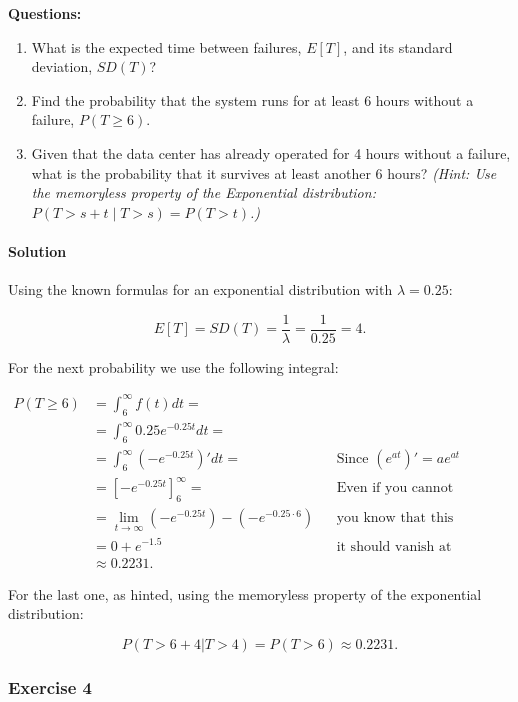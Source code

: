 \documentclass[
]{article}
\providecommand{\tightlist}{%
  \setlength{\itemsep}{0pt}\setlength{\parskip}{0pt}}
\begin{document}
\textbf{Questions:}

\begin{enumerate}
\def\labelenumi{\alph{enumi})}
\tightlist
\item
  What is the expected time between failures, \(E[T]\), and its standard
  deviation, \(SD(T)\)?
\item
  Find the probability that the system runs for at least 6 hours without
  a failure, \(P(T \ge 6)\).
\item
  Given that the data center has already operated for 4 hours without a
  failure, what is the probability that it survives at least another 6
  hours? \emph{(Hint: Use the memoryless property of the Exponential
  distribution: \(P(T > s + t \mid T > s) = P(T > t)\).)}
\end{enumerate}

\paragraph{Solution}\label{solution-2}

Using the known formulas for an exponential distribution with
\(\lambda=0.25\):

\[E[T]=SD(T)=\frac{1}{\lambda}=\frac{1}{0.25}=4.\]

For the next probability we use the following integral:

\[\begin{aligned}
  P(T\geq 6)&=\int_6^{\infty}f(t)dt=\\
  &=\int_6^{\infty}0.25e^{-0.25t}dt=\\
  &=\int_6^{\infty}(-e^{-0.25t})'dt=&&\text{Since $(e^{at})'=ae^{at}$}\\
  &=[-e^{-0.25t}]_6^\infty=&&\text{Even if you cannot compute the limit}\\
  &=\lim_{t\to\infty}(-e^{-0.25t})-(-e^{-0.25\cdot6})&&\text{you know that this corresponds to a PDF, so}\\
  &=0+e^{-1.5}&&\text{it should vanish at infinities.}\\
  &\approx0.2231.
\end{aligned}\]

For the last one, as hinted, using the memoryless property of the
exponential distribution:

\[P(T>6+4|T>4)=P(T>6)\approx0.2231.\]

\subsubsection{Exercise 4}\label{exercise-4}
\end{document}
